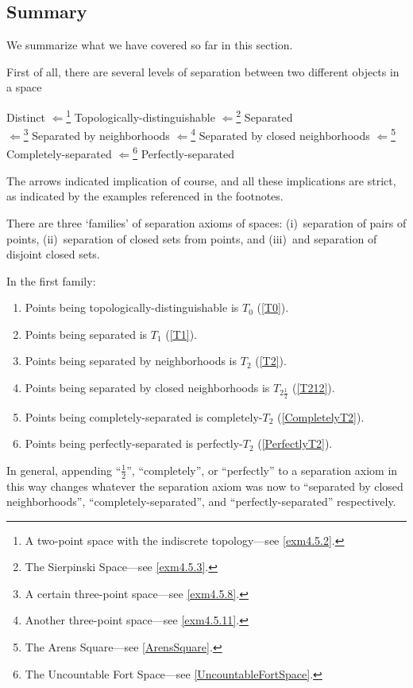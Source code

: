 \subsection{Summary}

We summarize what we have covered so far in this section.

First of all, there are several levels of separation between two different objects in a space
\begin{important}
Distinct $\Leftarrow$\footnote{A two-point space with the indiscrete topology---see \cref{exm4.5.2}.} Topologically-distinguishable $\Leftarrow$\footnote{The Sierpinski Space---see \cref{exm4.5.3}.} Separated \\ $\Leftarrow$\footnote{A certain three-point space---see \cref{exm4.5.8}.} Separated by neighborhoods $\Leftarrow$\footnote{Another three-point space---see \cref{exm4.5.11}.} Separated by closed neighborhoods $\Leftarrow$\footnote{The Arens Square---see \cref{ArensSquare}.} Completely-separated $\Leftarrow$\footnote{The Uncountable Fort Space---see \cref{UncountableFortSpace}.} Perfectly-separated
\end{important}
The arrows indicated implication of course, and all these implications are strict, as indicated by the examples referenced in the footnotes.

There are three `families' of separation axioms of spaces:  (i)~separation of pairs of points, (ii)~separation of closed sets from points, and (iii)~and separation of disjoint closed sets.

In the first family:
\begin{enumerate}
\item Points being topologically-distinguishable is $T_0$ (\cref{T0}).
\item Points being separated is $T_1$ (\cref{T1}).
\item Points being separated by neighborhoods is $T_2$ (\cref{T2}).
\item Points being separated by closed neighborhoods is $T_{2\frac{1}{2}}$ (\cref{T212}).
\item Points being completely-separated is completely-$T_2$ (\cref{CompletelyT2}).
\item Points being perfectly-separated is perfectly-$T_2$ (\cref{PerfectlyT2}).
\end{enumerate}
In general, appending ``$\frac{1}{2}$'', ``completely'', or ``perfectly'' to a separation axiom in this way changes whatever the separation axiom was now to ``separated by closed neighborhoods'', ``completely-separated'', and ``perfectly-separated'' respectively.

